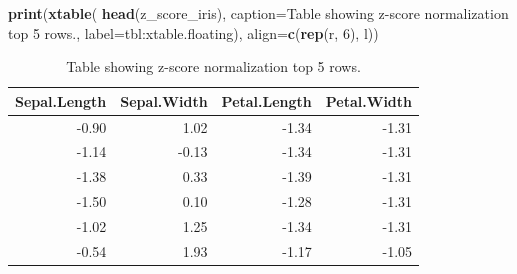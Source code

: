 \documentclass[a4paper,conference]{IEEEtran}
\newenvironment{Shaded}{\begin{snugshade}}{\end{snugshade}}
\newcommand{\AttributeTok}[1]{\textcolor[rgb]{0.13,0.29,0.53}{#1}}
\newcommand{\DecValTok}[1]{\textcolor[rgb]{0.00,0.00,0.81}{#1}}
\newcommand{\FunctionTok}[1]{\textcolor[rgb]{0.13,0.29,0.53}{\textbf{#1}}}
\newcommand{\NormalTok}[1]{#1}
\newcommand{\StringTok}[1]{\textcolor[rgb]{0.31,0.60,0.02}{#1}}
\begin{document}
\begin{Shaded}
\begin{Highlighting}[]
\FunctionTok{print}\NormalTok{(}\FunctionTok{xtable}\NormalTok{(}
    \FunctionTok{head}\NormalTok{(z\_score\_iris),}
    \AttributeTok{caption=}\StringTok{\textquotesingle{}Table showing z{-}score normalization top 5 rows.\textquotesingle{}}\NormalTok{,}
    \AttributeTok{label=}\StringTok{\textquotesingle{}tbl:xtable.floating\textquotesingle{}}\NormalTok{),}
    \AttributeTok{align=}\FunctionTok{c}\NormalTok{(}\FunctionTok{rep}\NormalTok{(}\StringTok{\textquotesingle{}r\textquotesingle{}}\NormalTok{, }\DecValTok{6}\NormalTok{), }\StringTok{\textquotesingle{}l\textquotesingle{}}\NormalTok{))}
\end{Highlighting}
\end{Shaded}

\begin{table}[!t]
\centering
\caption{Table showing z-score normalization top 5 rows.} 
\label{tbl:xtable.floating}
\begin{tabular}{rrrr}
  \hline
Sepal.Length & Sepal.Width & Petal.Length & Petal.Width \\ 
  \hline
-0.90 & 1.02 & -1.34 & -1.31 \\ 
  -1.14 & -0.13 & -1.34 & -1.31 \\ 
  -1.38 & 0.33 & -1.39 & -1.31 \\ 
  -1.50 & 0.10 & -1.28 & -1.31 \\ 
  -1.02 & 1.25 & -1.34 & -1.31 \\ 
  -0.54 & 1.93 & -1.17 & -1.05 \\ 
   \hline
\end{tabular}
\end{table}
\end{document}
